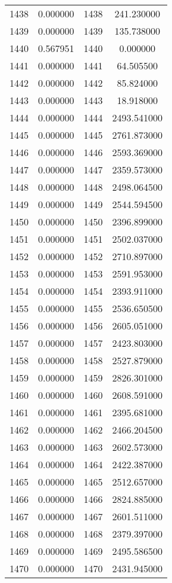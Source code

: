 \documentclass[12pt]{article}
\begin{document}
\begin{longtable}{@{}cccc@{}}
1438 & 0.000000 & 1438 & 241.230000 \\
1439 & 0.000000 & 1439 & 135.738000 \\
1440 & 0.567951 & 1440 & 0.000000 \\
1441 & 0.000000 & 1441 & 64.505500 \\
1442 & 0.000000 & 1442 & 85.824000 \\
1443 & 0.000000 & 1443 & 18.918000 \\
1444 & 0.000000 & 1444 & 2493.541000 \\
1445 & 0.000000 & 1445 & 2761.873000 \\
1446 & 0.000000 & 1446 & 2593.369000 \\
1447 & 0.000000 & 1447 & 2359.573000 \\
1448 & 0.000000 & 1448 & 2498.064500 \\
1449 & 0.000000 & 1449 & 2544.594500 \\
1450 & 0.000000 & 1450 & 2396.899000 \\
1451 & 0.000000 & 1451 & 2502.037000 \\
1452 & 0.000000 & 1452 & 2710.897000 \\
1453 & 0.000000 & 1453 & 2591.953000 \\
1454 & 0.000000 & 1454 & 2393.911000 \\
1455 & 0.000000 & 1455 & 2536.650500 \\
1456 & 0.000000 & 1456 & 2605.051000 \\
1457 & 0.000000 & 1457 & 2423.803000 \\
1458 & 0.000000 & 1458 & 2527.879000 \\
1459 & 0.000000 & 1459 & 2826.301000 \\
1460 & 0.000000 & 1460 & 2608.591000 \\
1461 & 0.000000 & 1461 & 2395.681000 \\
1462 & 0.000000 & 1462 & 2466.204500 \\
1463 & 0.000000 & 1463 & 2602.573000 \\
1464 & 0.000000 & 1464 & 2422.387000 \\
1465 & 0.000000 & 1465 & 2512.657000 \\
1466 & 0.000000 & 1466 & 2824.885000 \\
1467 & 0.000000 & 1467 & 2601.511000 \\
1468 & 0.000000 & 1468 & 2379.397000 \\
1469 & 0.000000 & 1469 & 2495.586500 \\
1470 & 0.000000 & 1470 & 2431.945000 \\

\end{longtable}
\end{document}

